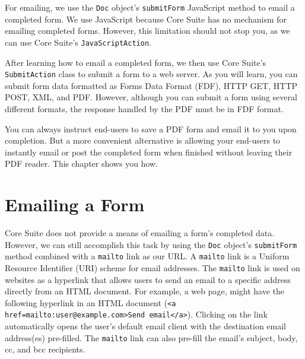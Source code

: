 \documentclass[american,letterpaper]{tufte-book}
\numberwithin{equation}{section}
\numberwithin{figure}{section}
\begin{document}
{{For emailing, we use the \texttt{Doc} object's \texttt{submitForm}
JavaScript method to email a completed form. We use JavaScript because
Core Suite has no mechanism for emailing completed forms. However,
this limitation should not stop you, as we can use Core Suite's \texttt{JavaScriptAction}.

After learning how to email a completed form, we then use Core Suite's
\texttt{SubmitAction} class to submit a form to a web server. As you
will learn, you can submit form data formatted as Forms Data Format
(FDF), HTTP GET, HTTP POST, XML, and PDF. However, although you can
submit a form using several different formats, the response handled
by the PDF must be in FDF format.

You can always instruct end-users to save a PDF form and email it
to you upon completion. But a more convenient alternative is allowing
your end-users to instantly email or post the completed form when
finished without leaving their PDF reader. This chapter shows you
how.

\section{Emailing a Form}

Core Suite does not provide a means of emailing a form's completed
data. However, we can still accomplish this task by using the \texttt{Doc}
object's \texttt{submitForm} method combined with a \texttt{mailto}
link as our URL. A \texttt{mailto} link is a Uniform Resource Identifier (URI) scheme
for email addresses. The \texttt{mailto} link is used on websites
as a hyperlink that allows users to send an email to a specific address
directly from an HTML document. For example, a web page, might have
the following hyperlink in an HTML document (\texttt{<a href=\textquotedbl mailto:user@example.com\textquotedbl >Send
email</a>}). Clicking on the link automatically opens the user's default
email client with the destination email address(es) pre-filled. The
\texttt{mailto} link can also pre-fill the email's subject, body,
cc, and bcc recipients. 

}}
\end{document}
